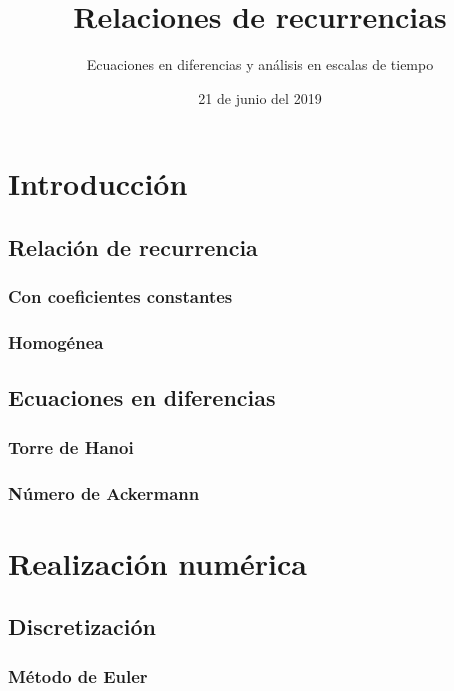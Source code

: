 \documentclass[spanish, utf8,handout]{beamer} %
\title[Teorema de los cuatro colores]{\Huge\sffamily Relaciones de recurrencias}
\subtitle{Ecuaciones en diferencias y análisis en escalas de tiempo}
\author[Grupo N$^\circ6$]{%
	\texorpdfstring{%
		\begin{columns}
			\column{.3\linewidth}
			\centering
			C. Aznarán Laos %
			\column{.3\linewidth}
			\centering
			F. Cruz Ordoñez %
		\end{columns}
		\vspace{12pt}
		\begin{columns}
			\column{.3\linewidth}
			\centering
			G. Quiroz Gómez %
			\column{.3\linewidth}
			\centering
			J. Micha Velasque %
		\end{columns}
		\vspace{12pt}
		\begin{columns}
			\column{.3\linewidth}
			\centering
			D. García Fernández %
			\centering
		\end{columns}
	}
	{Author 1, Author 2, Author 3}
}
\institute[FC -- UNI]{\large%
	Facultad de Ciencias \and%
	Universidad Nacional de Ingeniería
}
\date{21 de junio del 2019}
\theoremstyle{definition}
\begin{document}
\frame{\titlepage}

\begin{frame}{\contentsname}\transblindsvertical
	\tableofcontents
\end{frame}

\section{Introducción}

\subsection{Relación de recurrencia}
\subsubsection{Con coeficientes constantes}
\subsubsection{Homogénea}

\subsection{Ecuaciones en diferencias}

\subsubsection{Torre de Hanoi}
\subsubsection{Número de Ackermann}

\section{Realización numérica}

\subsection{Discretización}
\subsubsection{Método de Euler}
\end{document}
